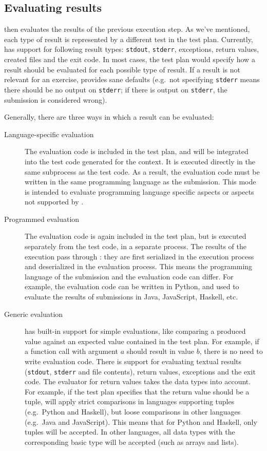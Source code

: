 \documentclass[5p,number]{elsarticle}
\begin{document}
    \subsection{Evaluating results}\label{subsec:evaluating-the-results}
    
    \tested{} then evaluates the results of the previous execution step.
    As we've mentioned, each type of result is represented by a different test in the test plan.
    Currently, \tested{} has support for following result types: \texttt{stdout}, \texttt{stderr}, exceptions, return values, created files and the exit code.
    In most cases, the test plan would specify how a result should be evaluated for each possible type of result.
    If a result is not relevant for an exercise, \tested{} provides sane defaults (e.g.\ not specifying \texttt{stderr} means there should be no output on \texttt{stderr}; if there is output on \texttt{stderr}, the submission is considered wrong).

    Generally, there are three ways in which a result can be evaluated:
    \begin{description}
        \item[Language-specific evaluation] The evaluation code is included in the test plan, and will be integrated into the test code generated for the context.
        It is executed directly in the same subprocess as the test code.
        As a result, the evaluation code must be written in the same programming language as the submission.
        This mode is intended to evaluate programming language specific aspects or aspects not supported by \tested{}.
        \item[Programmed evaluation] The evaluation code is again included in the test plan, but is executed separately from the test code, in a separate process.
        The results of the execution pass through \tested{}: they are first serialized in the execution process and deserialized in the evaluation process.
        This means the programming language of the submission and the evaluation code can differ.
        For example, the evaluation code can be written in Python, and used to evaluate the results of submissions in Java, JavaScript, Haskell, etc.
        \item[Generic evaluation] \tested{} has built-in support for simple evaluations, like comparing a produced value against an expected value contained in the test plan.
        For example, if a function call with argument $a$ should result in value $b$, there is no need to write evaluation code.
        There is support for evaluating textual results (\texttt{stdout}, \texttt{stderr} and file contents), return values, exceptions and the exit code.
        The evaluator for return values takes the data types into account.
        For example, if the test plan specifies that the return value should be a tuple, \tested{} will apply strict comparisons in languages supporting tuples (e.g.\ Python and Haskell), but loose comparisons in other languages (e.g.\ Java and JavaScript).
        This means that for Python and Haskell, only tuples will be accepted.
        In other languages, all data types with the corresponding basic type will be accepted (such as arrays and lists).
    \end{description}
\end{document}
